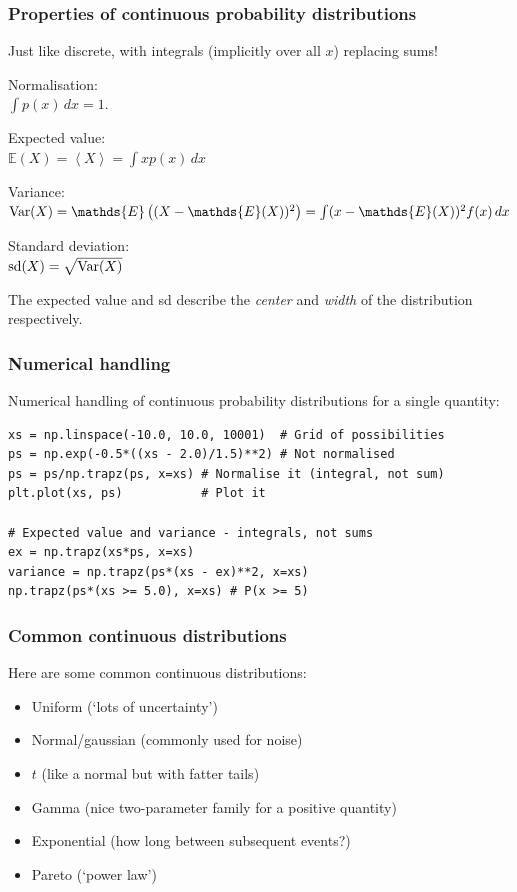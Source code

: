 \documentclass{beamer}
\begin{document}
\begin{frame}
\frametitle{Properties of continuous probability distributions}

Just like discrete, with integrals (implicitly over all $x$) replacing sums!

\pause
Normalisation:\\ $\int p(x) \, dx = 1$.\vspace{0.5em}

\pause
Expected value:\\$\mathds{E}(X) = \left<X\right> = \int x p(x) \, dx$\vspace{0.5em}

\pause
Variance:\\$\textnormal{Var}(X) = \mathds{E}\left((X - \mathds{E}(X))^2\right) = \int (x - \mathds{E}(X))^2 f(x) \, dx$\vspace{0.5em}

\pause
Standard deviation:\\$\textnormal{sd}(X) = \sqrt{\textnormal{Var}(X)}$

\pause
The expected value and sd describe the {\em center} and {\em width}
of the distribution respectively.

\end{frame}


\begin{frame}[t, fragile]
\frametitle{Numerical handling}
Numerical handling of continuous probability distributions for a single
quantity: \vspace{2em}

\begin{verbatim}
xs = np.linspace(-10.0, 10.0, 10001)  # Grid of possibilities
ps = np.exp(-0.5*((xs - 2.0)/1.5)**2) # Not normalised
ps = ps/np.trapz(ps, x=xs) # Normalise it (integral, not sum)
plt.plot(xs, ps)           # Plot it

# Expected value and variance - integrals, not sums
ex = np.trapz(xs*ps, x=xs) 
variance = np.trapz(ps*(xs - ex)**2, x=xs)
np.trapz(ps*(xs >= 5.0), x=xs) # P(x >= 5)
\end{verbatim}
\end{frame}


\begin{frame}[t, fragile]
\frametitle{Common continuous distributions}

Here are some common continuous distributions:

\begin{itemize}
\item <2-> Uniform (`lots of uncertainty')
\item <3-> Normal/gaussian (commonly used for noise)
\item <4-> $t$ (like a normal but with fatter tails)
\item <5-> Gamma (nice two-parameter family for a positive quantity)
\item <6-> Exponential (how long between subsequent events?)
\item <7-> Pareto (`power law')
\end{itemize}

\end{frame}
\end{document}
